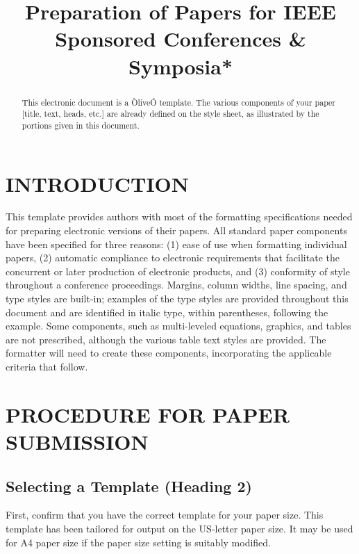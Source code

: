 \documentclass[letterpaper, 10 pt, conference]{ieeeconf}  %
\title{\LARGE \bf
Preparation of Papers for IEEE Sponsored Conferences \& Symposia*
}
\begin{document}
\maketitle
\thispagestyle{empty}
\pagestyle{empty}


\begin{abstract}

This electronic document is a ÒliveÓ template. The various components of your paper [title, text, heads, etc.] are already defined on the style sheet, as illustrated by the portions given in this document.

\end{abstract}


\section{INTRODUCTION}

This template provides authors with most of the formatting specifications needed for preparing electronic versions of their papers. All standard paper components have been specified for three reasons: (1) ease of use when formatting individual papers, (2) automatic compliance to electronic requirements that facilitate the concurrent or later production of electronic products, and (3) conformity of style throughout a conference proceedings. Margins, column widths, line spacing, and type styles are built-in; examples of the type styles are provided throughout this document and are identified in italic type, within parentheses, following the example. Some components, such as multi-leveled equations, graphics, and tables are not prescribed, although the various table text styles are provided. The formatter will need to create these components, incorporating the applicable criteria that follow.

\section{PROCEDURE FOR PAPER SUBMISSION}

\subsection{Selecting a Template (Heading 2)}

First, confirm that you have the correct template for your paper size. This template has been tailored for output on the US-letter paper size. 
It may be used for A4 paper size if the paper size setting is suitably modified.
\end{document}
